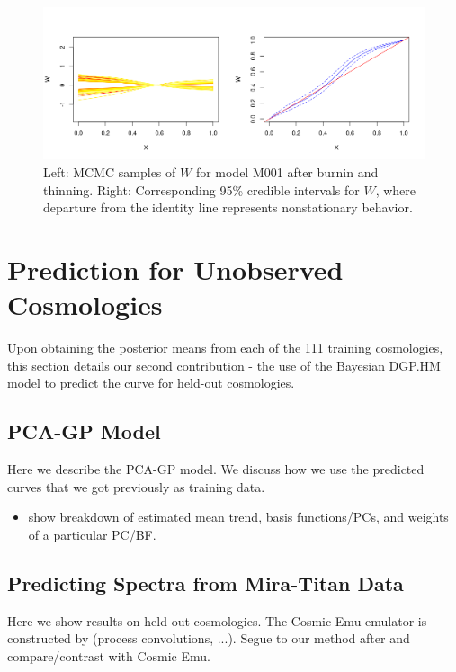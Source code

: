 \documentclass[11pt]{article}
\begin{document}
\begin{figure}[ht]
   \centering
   \includegraphics[width=6in]{plot_warp_M001.png}
   \caption{Left: MCMC samples of $W$ for model M001 after burnin and thinning. Right: Corresponding 95\% credible intervals for $W$, where departure from the identity line represents nonstationary behavior.}
   \label{fig:plot_warp}
\end{figure}

\section{Prediction for Unobserved Cosmologies}
\label{sec:pred}

Upon obtaining the posterior means from each of the 111 training cosmologies, this section details our second contribution - the use of the Bayesian DGP.HM model to predict the curve for held-out cosmologies.

\subsection{PCA-GP Model}
\label{subsec:pca}

Here we describe the PCA-GP model. We discuss how we use the predicted curves that we got previously as training data. \cite{higdon2008computer, higdon2010estcosmo}

\begin{itemize}
    \item show breakdown of estimated mean trend, basis functions/PCs, and weights of a particular PC/BF.
\end{itemize}

\subsection{Predicting Spectra from Mira-Titan Data}
\label{subsec:mira_pred}

Here we show results on held-out cosmologies.  The Cosmic Emu emulator is constructed by (process convolutions, ...). Segue to our method after and compare/contrast with Cosmic Emu. 
\end{document}
